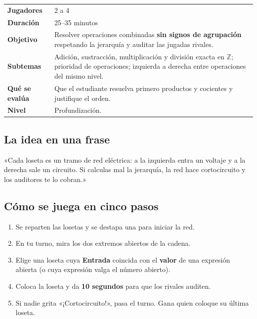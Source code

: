 \documentclass[12pt, letterpaper]{article}
\newcommand{\Z}{\mathbb{Z}}
\begin{document}
\begin{center}
\small
\begin{tabular}{@{}p{3cm} p{12.2cm}@{}}
\toprule
\textbf{Jugadores} & 2 a 4\\
\textbf{Duración} & 25--35 minutos\\
\textbf{Objetivo} & Resolver operaciones combinadas \textbf{sin signos de agrupación} respetando la jerarquía y auditar las jugadas rivales.\\
\textbf{Subtemas} & Adición, sustracción, multiplicación y división exacta en $\Z$; prioridad de operaciones; izquierda a derecha entre operaciones del mismo nivel.\\
\textbf{Qué se evalúa} & Que el estudiante resuelva primero productos y cocientes y justifique el orden.\\
\textbf{Nivel} & Profundización.\\
\bottomrule
\end{tabular}
\end{center}

\subsection{La idea en una frase}

\begin{cuadroextra}
  «Cada loseta es un tramo de red eléctrica: a la izquierda entra un voltaje y a la derecha sale un circuito. Si calculas mal la jerarquía, la red hace cortocircuito y los auditores te lo cobran.»
\end{cuadroextra}

\subsection{Cómo se juega en cinco pasos}

\begin{enumerate}[leftmargin=*]
  \item Se reparten las losetas y se destapa una para iniciar la red.
  \item En tu turno, mira los dos extremos abiertos de la cadena.
  \item Elige una loseta cuya \textbf{Entrada} coincida con el \textbf{valor} de una expresión abierta (o cuya expresión valga el número abierto).
  \item Coloca la loseta y da \textbf{10 segundos} para que los rivales auditen.
  \item Si nadie grita «¡Cortocircuito!», pasa el turno. Gana quien coloque su última loseta.
\end{enumerate}
\end{document}
